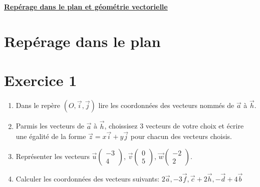 \documentclass[french]{article}
\begin{document}
\begin{center}
\underline{\textbf{Repérage dans le plan et géométrie vectorielle}}
\end{center}
\section{Repérage dans le plan}
\section*{Exercice 1}
\begin{enumerate}


\item Dans le repère $(O,\overrightarrow{i},\overrightarrow{j})$ lire les coordonnées des vecteurs nommés de $\overrightarrow{a}$ à $\overrightarrow{h}$.
\item Parmis les vecteurs de $\overrightarrow{a}$ à $\overrightarrow{h}$, choissisez 3 vecteurs de votre choix et écrire une égalité de la forme $\overrightarrow{z}= x\overrightarrow{i}+y\overrightarrow{j}$ pour chacun des vecteurs choisis.
\item Représenter les vecteurs $\overrightarrow{u} \left( \begin{array}{c}
-3\\
4
\end{array} \right)$, $\overrightarrow{v} \left( \begin{array}{c}
0\\
5
\end{array} \right)$, $\overrightarrow{w} \left( \begin{array}{c}
-2\\
2
\end{array} \right)$.
\item Calculer les coordonnées des vecteurs suivants: $2\overrightarrow{a}, -3\overrightarrow{f}, \overrightarrow{c} + 2\overrightarrow{h}, -\overrightarrow{d}+4\overrightarrow{b}$

\end{enumerate}
\end{document}
